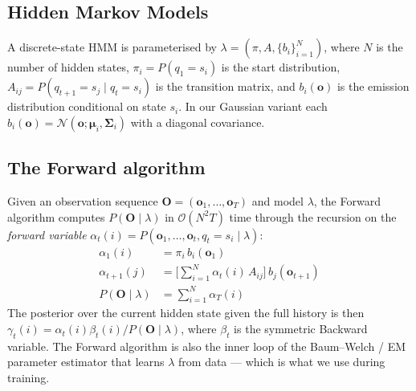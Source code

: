 \documentclass[11pt,a4paper]{article}
\begin{document}
\subsection{Hidden Markov Models}
A discrete-state HMM is parameterised by
$\lambda = (\pi, A, \{b_i\}_{i=1}^{N})$, where $N$ is the number of hidden
states, $\pi_i = P(q_1 = s_i)$ is the start distribution, $A_{ij} = P(q_{t+1}
= s_j \mid q_t = s_i)$ is the transition matrix, and $b_i(\mathbf{o})$ is the
emission distribution conditional on state $s_i$. In our Gaussian variant
each $b_i(\mathbf{o}) = \mathcal{N}(\mathbf{o}; \boldsymbol{\mu}_i,
\boldsymbol{\Sigma}_i)$ with a diagonal covariance.

\subsection{The Forward algorithm}\label{sec:forward}
Given an observation sequence
$\mathbf{O}\!=\!(\mathbf{o}_1,\dots,\mathbf{o}_T)$ and model $\lambda$, the
Forward algorithm computes $P(\mathbf{O}\mid\lambda)$ in $\mathcal{O}(N^2 T)$
time through the recursion on the \emph{forward variable}
$\alpha_t(i) = P(\mathbf{o}_1,\dots,\mathbf{o}_t, q_t = s_i \mid \lambda)$:
\begin{align}
    \alpha_1(i) &= \pi_i\, b_i(\mathbf{o}_1) \label{eq:fwd-init}\\
    \alpha_{t+1}(j) &= \Big[\sum_{i=1}^{N}\alpha_t(i)\,A_{ij}\Big]\,b_j(\mathbf{o}_{t+1})
        \label{eq:fwd-recur}\\
    P(\mathbf{O}\mid\lambda) &= \sum_{i=1}^{N}\alpha_T(i) \label{eq:fwd-term}
\end{align}
The posterior over the current hidden state given the full history is then
$\gamma_t(i) = \alpha_t(i)\beta_t(i)/P(\mathbf{O}\mid\lambda)$, where
$\beta_t$ is the symmetric Backward variable. The Forward algorithm is also
the inner loop of the Baum--Welch / EM parameter estimator
\cite{baum1970maximization} that learns $\lambda$ from data --- which is what
we use during training.
\end{document}

